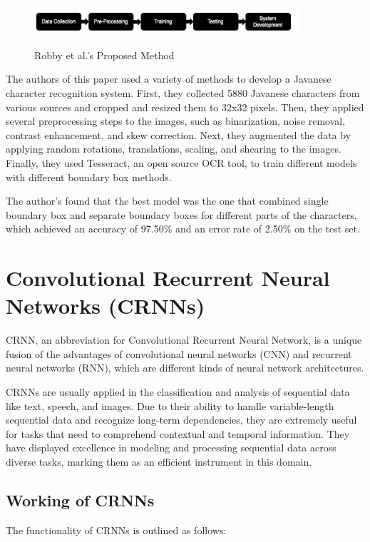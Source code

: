 \begin{figure}[ht]
    \centering
    \includegraphics[width=0.88\textwidth]{Figures/tesseract_papers/Robby_2019.jpg}
    \caption[Robby et al.'s Proposed Method]{Robby et al.'s Proposed Method}\cite{robbyImplementationOpticalCharacter2019}
    \label{fig:Robby et al.'s Proposed Method}
\end{figure}


The authors of this paper used a variety of methods to develop a Javanese character recognition system. First, they collected 5880 Javanese characters from various sources and cropped and resized them to 32x32 pixels. Then, they applied several preprocessing steps to the images, such as binarization, noise removal, contrast enhancement, and skew correction. Next, they augmented the data by applying random rotations, translations, scaling, and shearing to the images. Finally, they used Tesseract, an open source OCR tool, to train different models with different boundary box methods.

The author's found that the best model was the one that combined single boundary box and separate boundary boxes for different parts of the characters, which achieved an accuracy of 97.50\% and an error rate of 2.50\% on the test set.


\newpage
\section{Convolutional Recurrent Neural Networks (CRNNs)}

CRNN, an abbreviation for Convolutional Recurrent Neural Network, is a unique fusion of the advantages of convolutional neural networks (CNN) and recurrent neural networks (RNN), which are different kinds of neural network architectures.

CRNNs are usually applied in the classification and analysis of sequential data like text, speech, and images. Due to their ability to handle variable-length sequential data and recognize long-term dependencies, they are extremely useful for tasks that need to comprehend contextual and temporal information. They have displayed excellence in modeling and processing sequential data across diverse tasks, marking them as an efficient instrument in this domain.

\subsection{Working of CRNNs}
The functionality of CRNNs is outlined as follows:


